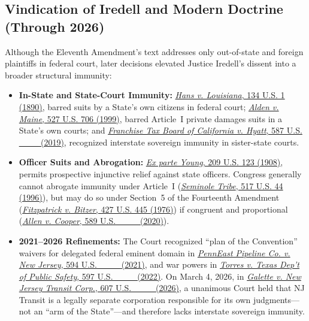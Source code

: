 \documentclass[12pt]{article}
\begin{document}
\subsection{Vindication of Iredell and Modern Doctrine (Through 2026)}
Although the Eleventh Amendment's text addresses only out-of-state and foreign plaintiffs in federal court, later decisions elevated Justice Iredell's dissent into a broader structural immunity:
\begin{itemize}
  \item \textbf{In-State and State-Court Immunity:} \href{https://supreme.justia.com/cases/federal/us/134/1/}{\emph{Hans v. Louisiana}, 134 U.S. 1 (1890)}, barred suits by a State's own citizens in federal court; \href{https://supreme.justia.com/cases/federal/us/527/706/}{\emph{Alden v. Maine}, 527 U.S. 706 (1999)}, barred Article~I private damages suits in a State's own courts; and \href{https://supreme.justia.com/cases/federal/us/587/17-1299/}{\emph{Franchise Tax Board of California v. Hyatt}, 587 U.S. \_\_\_ (2019)}, recognized interstate sovereign immunity in sister-state courts.
  \item \textbf{Officer Suits and Abrogation:} \href{https://supreme.justia.com/cases/federal/us/209/123/}{\emph{Ex parte Young}, 209 U.S. 123 (1908)}, permits prospective injunctive relief against state officers. Congress generally cannot abrogate immunity under Article~I (\href{https://supreme.justia.com/cases/federal/us/517/44/}{\emph{Seminole Tribe}, 517 U.S. 44 (1996)}), but may do so under Section~5 of the Fourteenth Amendment (\href{https://supreme.justia.com/cases/federal/us/427/445/}{\emph{Fitzpatrick v. Bitzer}, 427 U.S. 445 (1976)}) if congruent and proportional (\href{https://supreme.justia.com/cases/federal/us/589/18-877/}{\emph{Allen v. Cooper}, 589 U.S. \_\_\_ (2020)}).
  \item \textbf{2021--2026 Refinements:} The Court recognized ``plan of the Convention'' waivers for delegated federal eminent domain in \href{https://supreme.justia.com/cases/federal/us/594/19-1039/}{\emph{PennEast Pipeline Co. v. New Jersey}, 594 U.S. \_\_\_ (2021)}, and war powers in \href{https://supreme.justia.com/cases/federal/us/597/20-603/}{\emph{Torres v. Texas Dep't of Public Safety}, 597 U.S. \_\_\_ (2022)}. On March 4, 2026, in \href{https://supreme.justia.com/cases/federal/us/607/24-1021/}{\emph{Galette v. New Jersey Transit Corp.}, 607 U.S. \_\_\_ (2026)}, a unanimous Court held that NJ Transit is a legally separate corporation responsible for its own judgments---not an ``arm of the State''---and therefore lacks interstate sovereign immunity.
\end{itemize}
\end{document}
